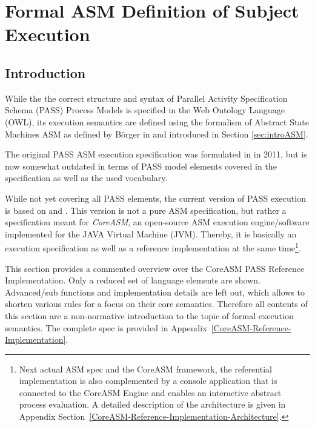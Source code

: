 \section{Formal ASM Definition of Subject Execution}
\label{sec:PASSExec}


\subsection{Introduction}

While the the correct structure and syntax of Parallel Activity Specification Schema (PASS) Process Models is specified in the Web Ontology Language (OWL), its execution semantics are defined using the formalism of Abstract State Machines ASM as defined by Börger in \cite{book:ASM-2003} and introduced in Section \ref{sec:introASM}.

The original PASS ASM execution specification was formulated in \cite{boerger2011interpreter} in 2011, but is now somewhat outdated in terms of PASS model elements covered in the specification as well as the used vocabulary. 

While not yet covering all PASS elements, the current version of PASS execution is based on \cite{article:PASS-ASM} and \cite{article:PASS-CoreASM}. This version is not a pure ASM specification, but rather a specification meant for \textit{CoreASM}, an open-source ASM execution engine/software implemented for the JAVA Virtual Machine (JVM)\cite{Farahbod2011}. Thereby, it is basically an execution specification as well as a reference implementation at the same time\footnote{Next actual ASM spec and the CoreASM framework, the referential implementation is also complemented by a console application that is connected to the CoreASM Engine and enables an interactive abstract process evaluation. A detailed description of the architecture is given in Appendix Section~\ref{CoreASM-Reference-Implementation-Architecture}.}.

This section provides a commented overview over the CoreASM PASS Reference Implementation. Only a reduced set of language elements are shown. Advanced/sub functions and implementation details are left out, which allows to shorten various rules for a focus on their core semantics. Therefore all contents of this section are a non-normative introduction to the topic of formal execution semantics. The complete spec is provided in Appendix~\ref{CoreASM-Reference-Implementation}. 


